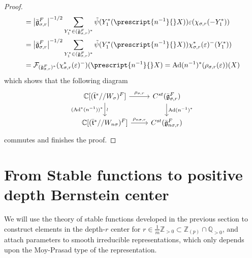 \documentclass[11 pt]{article}
\numberwithin{equation}{subsection}
\theoremstyle{definition}
\theoremstyle{remark}
\theoremstyle{conjecture}
\newcommand{\bt}{\bar{\mathfrak t}}
\newcommand{\bg}{\bar{\mathfrak g}}
\newcommand{\Ad}{\mathrm{Ad}}
\newcommand{\Z}{\mathbb Z}
\newcommand{\Q}{\mathbb Q}
\newcommand{\C}{\mathbb C}
\newcommand{\mcF}{\mathcal F}
\newcommand{\blue}{\textcolor{blue}}
\begin{document}
\begin{proof}
\begin{align*}
        &=\left|\bg_{\sigma,r}^F\right|^{-1/2}\sum_{Y_1^* \in (\bg_{\sigma,r}^F)^*}\Tilde{\psi}(Y_1^*(\prescript{n^{-1}}{}X))\varepsilon(\chi_{\sigma,r}(-Y_1^*))\\
        &=\left|\bg_{\sigma,r}^F\right|^{-1/2}\sum_{Y_1^* \in (\bg_{\sigma,r}^F)^*}\Tilde{\psi}(Y_1^*(\prescript{n^{-1}}{}X))\chi_{\sigma,r}^*(\varepsilon)^-(Y_1^*))\\
        &=\mcF_{(\bg_{\sigma,r}^F)^*}(\chi_{\sigma,r}^*(\varepsilon)^-)(\prescript{n^{-1}}{}X)=\Ad(n^{-1})^*(\rho_{\sigma,r}(\varepsilon))(X)
    \end{align*}
     which shows that the following diagram 
    \begin{equation}\label{adjnstable}
        \begin{tikzcd}
            \C[(\bt^*//W_\sigma)^F]\arrow[d,"\wr", "(\Ad^*(n^{-1}))^*"'] \arrow{r}{\rho_{\sigma,r}} & C^{st}(\bg_{\sigma,r}^F)\arrow{d}{\Ad(n^{-1})^*} \\
            \C[(\bt^*//W_{n\sigma})^F]\arrow{r}{\rho_{n\sigma,r}}& C^{st}(\bg_{n\sigma,r}^F)
        \end{tikzcd}
    \end{equation}
    commutes and finishes the proof.
\end{proof}

\section{From Stable functions to positive depth Bernstein center}\label{section:stablefnstocenter}
We will use the theory of stable functions developed in the previous section to construct elements in the depth-$r$ center for $r \in \frac{1}{m}\Z_{>0} \subset \Z_{(p)}\cap \Q_{>0}$, and  attach parameters to smooth irreducible representations, which only depends upon the Moy-Prasad type of the representation. \paragraph{}
\end{document}
